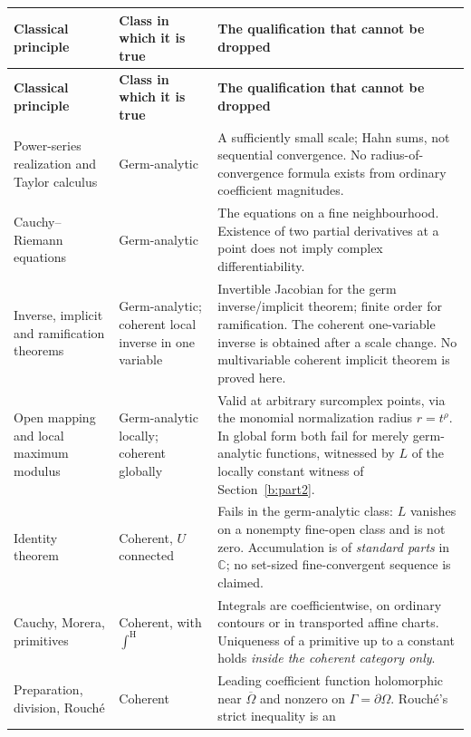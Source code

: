 \documentclass[11pt,a4paper]{article}
\numberwithin{equation}{section}
\theoremstyle{definition}
\theoremstyle{remark}
\theoremstyle{plain}
\newcommand{\CC}{\mathbb C}
\newcommand{\intH}{{\int^{\mathrm H}}}
\begin{document}
\begin{center}\small
\begin{longtable}{@{}>{\raggedright\arraybackslash}p{}
                    >{\raggedright\arraybackslash}p{}
                    >{\raggedright\arraybackslash}p{}@{}}
\toprule
\textbf{Classical principle} & \textbf{Class in which it is true} &
\textbf{The qualification that cannot be dropped}\\
\midrule
\endfirsthead
\toprule
\textbf{Classical principle} & \textbf{Class in which it is true} &
\textbf{The qualification that cannot be dropped}\\
\midrule
\endhead
\bottomrule
\endfoot
Power-series realization and Taylor calculus &
Germ-analytic &
A sufficiently small scale; Hahn sums, not sequential convergence.  No
radius-of-convergence formula exists from ordinary coefficient
magnitudes.\\[3pt]
Cauchy--Riemann equations &
Germ-analytic &
The equations on a fine neighbourhood.  Existence of two partial
derivatives at a point does not imply complex differentiability.\\[3pt]
Inverse, implicit and ramification theorems &
Germ-analytic; coherent local inverse in one variable &
Invertible Jacobian for the germ inverse/implicit theorem; finite order
for ramification. The coherent one-variable inverse is obtained after
a scale change. No multivariable coherent implicit theorem is proved here.\\[3pt]
Open mapping and local maximum modulus &
Germ-analytic locally; coherent globally &
Valid at arbitrary surcomplex points, via the monomial normalization
radius $r=t^{\rho}$.  In global form both fail for merely
germ-analytic functions, witnessed by $L$ of
the locally constant witness of Section~\ref{b:part2}.\\[3pt]
Identity theorem &
Coherent, $U$ connected &
Fails in the germ-analytic class: $L$ vanishes on a nonempty fine-open
class and is not zero.  Accumulation is of \emph{standard parts} in
$\CC$; no set-sized fine-convergent sequence is claimed.\\[3pt]
Cauchy, Morera, primitives &
Coherent, with $\intH$ &
Integrals are coefficientwise, on ordinary contours or in transported
affine charts.  Uniqueness of a primitive up to a constant holds
\emph{inside the coherent category only}.\\[3pt]
Preparation, division, Rouch\'e &
Coherent &
Leading coefficient function holomorphic near $\overline\Omega$ and
nonzero on $\Gamma=\partial\Omega$.  Rouch\'e's strict inequality is an

\end{longtable}
\end{center}
\end{document}
